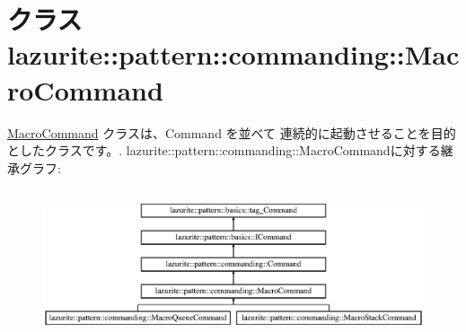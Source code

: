 \hypertarget{classlazurite_1_1pattern_1_1commanding_1_1_macro_command}{
\section{クラス lazurite::pattern::commanding::MacroCommand}
\label{classlazurite_1_1pattern_1_1commanding_1_1_macro_command}
}


\hyperlink{classlazurite_1_1pattern_1_1commanding_1_1_macro_command}{MacroCommand} クラスは、Command を並べて 連続的に起動させることを目的としたクラスです。.  
lazurite::pattern::commanding::MacroCommandに対する継承グラフ:\begin{figure}[H]
\begin{center}
\leavevmode
\includegraphics[height=4.40252cm]{classlazurite_1_1pattern_1_1commanding_1_1_macro_command}
\end{center}
\end{figure}
